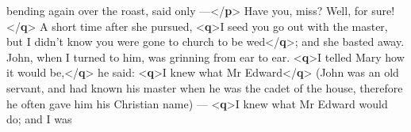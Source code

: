 \documentclass[11pt,twoside]{article}\makeatletter
\begin{document}
\begin{shaded}
\hspace*{6pt}\hspace*{6pt} bending again over the roast, said only —{</\textbf{p}>}\mbox{}\newline 
{}\mbox{}\newline 
\hspace*{6pt}Have you, miss? Well, for sure!{</\textbf{q}>}\mbox{}\newline 
{}\mbox{}\newline 
{}A short time after she pursued, {<\textbf{q}>}I seed you go out with\mbox{}\newline 
\hspace*{6pt}\hspace*{6pt}\hspace*{6pt}\hspace*{6pt} the master, but I didn't know you were gone to church to be\mbox{}\newline 
\hspace*{6pt}\hspace*{6pt}\hspace*{6pt}\hspace*{6pt} wed{</\textbf{q}>}; and she basted away. John, when I turned to him,\mbox{}\newline 
\hspace*{6pt}\hspace*{6pt} was grinning from ear to ear. {<\textbf{q}>}I telled Mary how it would\mbox{}\newline 
\hspace*{6pt}\hspace*{6pt}\hspace*{6pt}\hspace*{6pt} be,{</\textbf{q}>} he said: {<\textbf{q}>}I knew what Mr Edward{</\textbf{q}>} (John was an\mbox{}\newline 
\hspace*{6pt}\hspace*{6pt} old servant, and had known his master when he was the cadet\mbox{}\newline 
\hspace*{6pt}\hspace*{6pt} of the house, therefore he often gave him his Christian\mbox{}\newline 
\hspace*{6pt}\hspace*{6pt} name) — {<\textbf{q}>}I knew what Mr Edward would do; and I was\mbox{}\newline 

\end{shaded}
\end{document}
